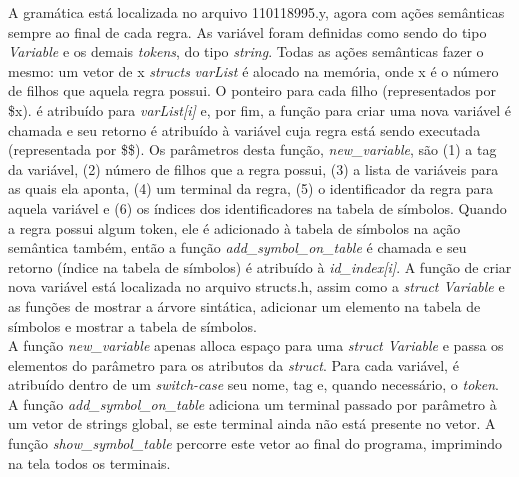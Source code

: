 \documentclass[12pt]{article}
\begin{document}
\indent A gramática está localizada no arquivo 110118995.y, agora com ações semânticas sempre ao final de cada regra. As variável foram definidas como sendo do tipo \textit{Variable} e os demais \textit{tokens}, do tipo \textit{string}. Todas as ações semânticas fazer o mesmo: um vetor de x \textit{structs} \textit{varList} é alocado na memória, onde x é o número de filhos que aquela regra possui. O ponteiro para cada filho (representados por \$x). é atribuído para \textit{varList[i] }e, por fim, a função para criar uma nova variável é chamada e seu retorno é atribuído à variável cuja regra está sendo executada (representada por \$\$). Os parâmetros desta função, \textit{new\_variable}, são (1) a tag da variável, (2) número de filhos que a regra possui, (3) a lista de variáveis para as quais ela aponta, (4) um terminal da regra, (5) o identificador da regra para aquela variável e (6) os índices dos identificadores na tabela de símbolos. Quando a regra possui algum token, ele é adicionado à tabela de símbolos na ação semântica também, então a função \textit{add\_symbol\_on\_table} é chamada e seu retorno (índice na tabela de símbolos) é atribuído à \textit{id\_index[i]}. A função de criar nova variável está localizada no arquivo structs.h, assim como a \textit{struct Variable} e as funções de mostrar a árvore sintática, adicionar um elemento na tabela de símbolos e mostrar a tabela de símbolos.  \\
\indent A função \textit{new\_variable} apenas alloca espaço para uma \textit{struct Variable} e passa os elementos do parâmetro para os atributos da \textit{struct}. Para cada variável, é atribuído dentro de um \textit{switch-case} seu nome, tag e, quando necessário, o \textit{token}. A função \textit{add\_symbol\_on\_table} adiciona um terminal passado por parâmetro à um vetor de strings global, se este terminal ainda não está presente no vetor. A função \textit{show\_symbol\_table} percorre este vetor ao final do programa, imprimindo na tela todos os terminais.
\end{document}
